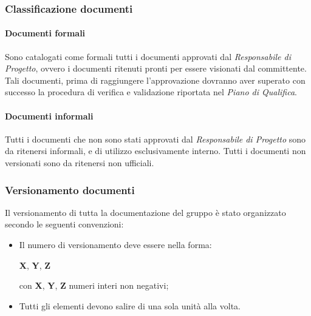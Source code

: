 \subsubsection{Classificazione documenti}
\paragraph{Documenti formali}
Sono catalogati come formali tutti i documenti approvati dal \textit{Responsabile di Progetto}, ovvero i documenti ritenuti pronti per essere visionati dal committente. Tali documenti, prima di raggiungere l'approvazione dovranno aver superato con successo la procedura di verifica e validazione riportata nel \textit{Piano di Qualifica}.
\paragraph{Documenti informali}
Tutti i documenti che non sono stati approvati dal \textit{Responsabile di Progetto} sono da ritenersi informali, e di utilizzo esclusivamente interno. Tutti i documenti non versionati sono da ritenersi non ufficiali.

\subsubsection{Versionamento documenti}
Il versionamento di tutta la documentazione del gruppo \gruppo{} è stato organizzato secondo le seguenti convenzioni:
\begin{itemize}
\item Il numero di versionamento deve essere nella forma:

\begin{center}
\textbf{X}, \textbf{Y}, \textbf{Z}
\end{center}

con \textbf{X}, \textbf{Y}, \textbf{Z} numeri interi non negativi;
\item Tutti gli elementi devono salire di una sola unità alla volta.
\end{itemize}

